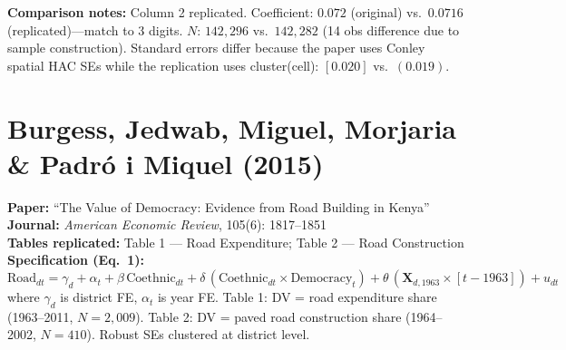 \documentclass[11pt,a4paper]{article}
\begin{document}
\vspace{1cm}
\textbf{Comparison notes:} Column 2 replicated. Coefficient: $0.072$ (original) vs.\ $0.0716$ (replicated)---match to 3 digits. $N$: $142{,}296$ vs.\ $142{,}282$ (14 obs difference due to sample construction). Standard errors differ because the paper uses Conley spatial HAC SEs while the replication uses cluster(cell): $[0.020]$ vs.\ $(0.019)$.

\newpage

\section{Burgess, Jedwab, Miguel, Morjaria \& Padr\'o i Miquel (2015)}

\textbf{Paper:} ``The Value of Democracy: Evidence from Road Building in Kenya''\\
\textbf{Journal:} \textit{American Economic Review}, 105(6): 1817--1851\\
\textbf{Tables replicated:} Table 1 --- Road Expenditure; Table 2 --- Road Construction\\
\textbf{Specification (Eq.\ 1):}
\[
\text{Road}_{dt} = \gamma_d + \alpha_t + \beta\,\text{Coethnic}_{dt} + \delta\,(\text{Coethnic}_{dt} \times \text{Democracy}_t) + \theta\,(\mathbf{X}_{d,1963} \times [t - 1963]) + u_{dt}
\]
where $\gamma_d$ is district FE, $\alpha_t$ is year FE. Table 1: DV = road expenditure share (1963--2011, $N=2{,}009$). Table 2: DV = paved road construction share (1964--2002, $N=410$). Robust SEs clustered at district level.

\vspace{0.3cm}
\noindent{}
\end{document}
